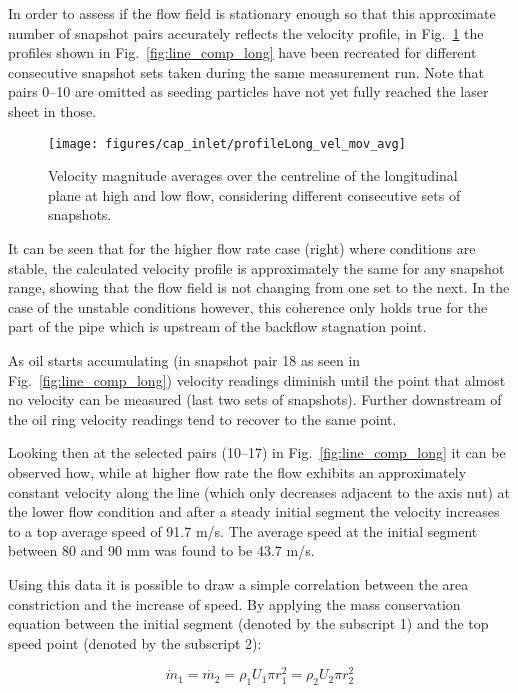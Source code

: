 In order to assess if the flow field is stationary enough so that this approximate number of snapshot pairs accurately reflects the velocity profile, in Fig.~\ref{fig:line_comp_long_mov_avg} the profiles shown in Fig.~\ref{fig:line_comp_long} have been recreated for different consecutive snapshot sets taken during the same measurement run. Note that pairs 0--10 are omitted as seeding particles have not yet fully reached the laser sheet in those.

\begin{figure}[thb!]
\centering
\texttt{[image: figures/cap\_inlet/profileLong\_vel\_mov\_avg]}
\caption{Velocity magnitude averages over the centreline of the longitudinal plane at high and low flow, considering different consecutive sets of snapshots.}
\label{fig:line_comp_long_mov_avg}
\end{figure}

It can be seen that for the higher flow rate case (right) where conditions are stable, the calculated velocity profile is approximately the same for any snapshot range, showing that the flow field is not changing from one set to the next. In the case of the unstable conditions however, this coherence only holds true for the part of the pipe which is upstream of the backflow stagnation point.

As oil starts accumulating (in snapshot pair 18 as seen in Fig.~\ref{fig:line_comp_long}) velocity readings diminish until the point that almost no velocity can be measured (last two sets of snapshots). Further downstream of the oil ring velocity readings tend to recover to the same point.

Looking then at the selected pairs (10--17) in Fig.~\ref{fig:line_comp_long} it can be observed how, while at higher flow rate the flow exhibits an approximately constant velocity along the line (which only decreases adjacent to the axis nut) at the lower flow condition and after a steady initial segment the velocity increases to a top average speed of 91.7 m/s. The average speed at the initial segment between 80 and 90 mm was found to be 43.7 m/s.

Using this data it is possible to draw a simple correlation between the area constriction and the increase of speed. By applying the mass conservation equation between the initial segment (denoted by the subscript 1) and the top speed point (denoted by the subscript 2):

\begin{equation}
  \dot{m}_1 = \dot{m_2} = \rho_1 U_1 \pi r_1^2 = \rho_2 U_2 \pi r_2^2
\end{equation}

